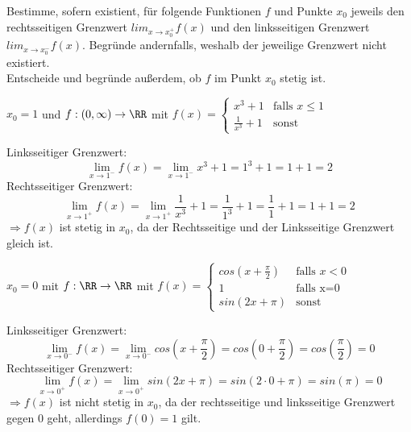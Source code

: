 Bestimme, sofern existient, für folgende Funktionen $f$ und Punkte $x_0$ jeweils den rechtsseitigen Grenzwert $lim_{x\to x_0^+}f(x)$ und den linksseitigen Grenzwert $lim_{x\to x_0^-}f(x)$. Begründe andernfalls, weshalb der jeweilige Grenzwert nicht existiert. \\
Entscheide und begründe außerdem, ob $f$ im Punkt $x_0$ stetig ist.

\begin{subtask}
    $x_0=1$ und $f:(0,\infty)\to\RR$ mit $f(x)=
    \begin{cases}
        x^3+1 & \text{falls $x\leq 1$} \\
        \frac{1}{x^3}+1 & \text{sonst}
    \end{cases}$
\end{subtask}
\begin{solution}
    Linksseitiger Grenzwert: \[\lim_{x\to1^-}f(x)=\lim_{x\to1^-}x^3+1=1^3+1=1+1=2\]
    Rechtsseitiger Grenzwert: \[\lim_{x\to1^+}f(x)=\lim_{x\to1^+}\frac{1}{x^3}+1=\frac{1}{1^3}+1=\frac11+1=1+1=2\]
    $\Rightarrow f(x)$ ist stetig in $x_0$, da der Rechtsseitige und der Linksseitige Grenzwert gleich ist.
\end{solution}

\begin{subtask}
    $x_0=0$ mit $f:\RR\to\RR$ mit $f(x)=
    \begin{cases}
        cos(x+\frac{\pi}{2}) & \text{falls $x<0$} \\
        1 & \text{falls x=0} \\
        sin(2x+\pi) & \text{sonst}
    \end{cases}$
\end{subtask}
\begin{solution}
    Linksseitiger Grenzwert:
    \[
        \lim_{x\to0^-}f(x)
        =\lim_{x\to0^-}cos(x+\frac{\pi}{2})
        =cos(0+\frac{\pi}{2})
        =cos(\frac{\pi}{2})=0
    \]
    Rechtsseitiger Grenzwert:
    \[
        \lim_{x\to0^+}f(x)
        =\lim_{x\to0^+}sin(2x+\pi)
        =sin(2\cdot0+\pi)
        =sin(\pi)=0
    \]
    $\Rightarrow f(x)$ ist nicht stetig in $x_0$, da der rechtsseitige und linksseitige Grenzwert gegen $0$ geht, allerdings $f(0)=1$ gilt.
\end{solution}